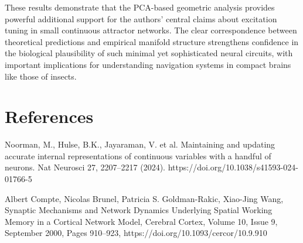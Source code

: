 \documentclass[11pt,a4paper]{article}
\begin{document}
These results demonstrate that the PCA-based geometric analysis provides powerful additional support for the authors' central claims about excitation tuning in small continuous attractor networks. The clear correspondence between theoretical predictions and empirical manifold structure strengthens confidence in the biological plausibility of such minimal yet sophisticated neural circuits, with important implications for understanding navigation systems in compact brains like those of insects.

\section*{References}

Noorman, M., Hulse, B.K., Jayaraman, V. et al. Maintaining and updating accurate internal representations of continuous variables with a handful of neurons. Nat Neurosci 27, 2207–2217 (2024). https://doi.org/10.1038/s41593-024-01766-5

Albert Compte, Nicolas Brunel, Patricia S. Goldman-Rakic, Xiao-Jing Wang, Synaptic Mechanisms and Network Dynamics Underlying Spatial Working Memory in a Cortical Network Model, Cerebral Cortex, Volume 10, Issue 9, September 2000, Pages 910–923, https://doi.org/10.1093/cercor/10.9.910
\end{document}
